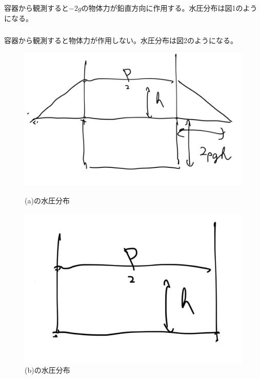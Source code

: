 \documentclass[a4paper]{jsarticle}
\begin{document}
\subsection{}
\subsubsection{}
容器から観測すると$-2g$の物体力が鉛直方向に作用する。水圧分布は図1のようになる。
\subsubsection{}
容器から観測すると物体力が作用しない。水圧分布は図2のようになる。
\begin{figure}[htb]
  \begin{minipage}{0.4\hsize}
    \centering
    \includegraphics[width=\hsize]{fig1.png}
    \caption{(a)の水圧分布}
  \end{minipage}
  \begin{minipage}{0.4\hsize}
    \centering
    \includegraphics[width=0.5\hsize]{fig2.png}
    \caption{(b)の水圧分布}
  \end{minipage}
\end{figure}
\end{document}
